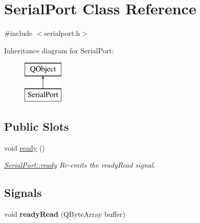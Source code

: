 \hypertarget{classSerialPort}{\section{Serial\-Port Class Reference}
\label{classSerialPort}
}


{\ttfamily \#include $<$serialport.\-h$>$}

Inheritance diagram for Serial\-Port\-:\begin{figure}[H]
\begin{center}
\leavevmode
\includegraphics[height=2.000000cm]{classSerialPort}
\end{center}
\end{figure}
\subsection*{Public Slots}
\begin{DoxyCompactItemize}
\item 
\hypertarget{classSerialPort_a76a7bb63e3f581ccb55a5951bf97a4e3}{void \hyperlink{classSerialPort_a76a7bb63e3f581ccb55a5951bf97a4e3}{ready} ()}\label{classSerialPort_a76a7bb63e3f581ccb55a5951bf97a4e3}

\begin{DoxyCompactList}\small\item\em \hyperlink{classSerialPort_a76a7bb63e3f581ccb55a5951bf97a4e3}{Serial\-Port\-::ready} Re-\/emits the ready\-Read signal. \end{DoxyCompactList}\end{DoxyCompactItemize}
\subsection*{Signals}
\begin{DoxyCompactItemize}
\item 
\hypertarget{classSerialPort_a3ec0fe7fd001c56fb95e010da11817c0}{void {\bfseries ready\-Read} (Q\-Byte\-Array buffer)}\label{classSerialPort_a3ec0fe7fd001c56fb95e010da11817c0}

\end{DoxyCompactItemize}
